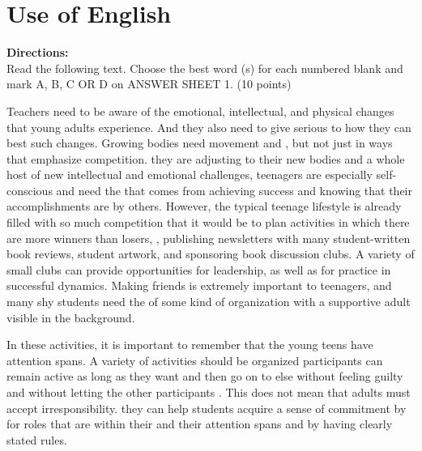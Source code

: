


\section{Use of English}

\noindent
\textbf{Directions:}\\
Read the following text. Choose the best word (s) for each
	numbered blank and mark A, B, C OR D on ANSWER SHEET 1. (10 points)

\TiGanSpace


Teachers need to be aware of the emotional, intellectual, and physical
changes that young adults experience. And they also need to give serious
\cloze to how they can best \cloze such changes. Growing
bodies need movement and \cloze , but not just in ways that
emphasize competition. \cloze they are adjusting to their new
bodies and a whole host of new intellectual and emotional challenges,
teenagers are especially self-conscious and need the \cloze that
comes from achieving success and knowing that their accomplishments are
\cloze by others. However, the typical teenage lifestyle is
already filled with so much competition that it would be \cloze
to plan activities in which there are more winners than losers,
\cloze , publishing newsletters with many student-written book
reviews, \cloze student artwork, and sponsoring book discussion
clubs. A variety of small clubs can provide \cloze opportunities
for leadership, as well as for practice in successful \cloze
dynamics. Making friends is extremely important to teenagers, and many
shy students need the \cloze of some kind of organization with a
supportive adult \cloze visible in the background.

In these activities, it is important to remember that the young teens
have \cloze attention spans. A variety of activities should be
organized \cloze participants can remain active as long as they
want and then go on to \cloze else without feeling guilty and
without letting the other participants \cloze. This does not
mean that adults must accept irresponsibility. \cloze they can
help students acquire a sense of commitment by \cloze for roles
that are within their \cloze and their attention spans and by
having clearly stated rules.


\newpage

